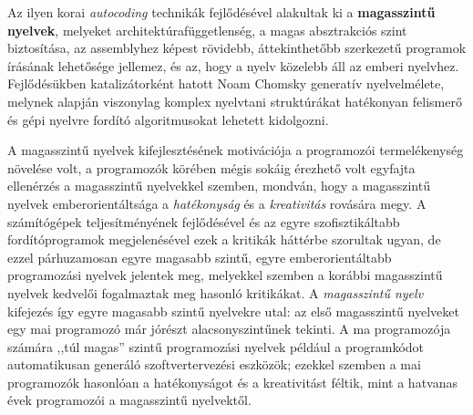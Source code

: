 Az ilyen korai \textit{autocoding} technikák fejlődésével alakultak ki a \textbf{magasszintű nyelvek}, melyeket architektúrafüggetlenség, a magas absztrakciós szint biztosítása, az assemblyhez képest rövidebb, áttekinthetőbb szerkezetű programok írásának lehetősége jellemez, és az, hogy a nyelv közelebb áll az emberi nyelvhez.
Fejlődésükben katalizátorként hatott Noam Chomsky generatív nyelvelmélete, melynek alapján viszonylag komplex nyelvtani struktúrákat hatékonyan felismerő és gépi nyelvre fordító algoritmusokat lehetett kidolgozni.

A magasszintű nyelvek kifejlesztésének motivációja a programozói termelékenység növelése volt\cite{Backus78}, a programozók körében mégis sokáig érezhető volt egyfajta ellenérzés a magasszintű nyelvekkel szemben, mondván, hogy a magasszintű nyelvek emberorientáltsága a \textit{hatékonyság} és a \textit{kreativitás} rovására megy\cite[12.~fejezet]{MythManMonth}.
A számítógépek teljesítményének fejlődésével és az egyre szofisztikáltabb fordítóprogramok megjelenésével ezek a kritikák háttérbe szorultak ugyan, de ezzel párhuzamosan egyre magasabb szintű, egyre emberorientáltabb programozási nyelvek jelentek meg, melyekkel szemben a korábbi magasszintű nyelvek kedvelői fogalmaztak meg hasonló kritikákat.
A \textit{magasszintű nyelv} kifejezés így egyre magasabb szintű nyelvekre utal: az első magasszintű nyelveket egy mai programozó már jórészt alacsonyszintűnek tekinti.
A ma programozója számára ,,túl magas'' szintű programozási nyelvek például a programkódot automatikusan generáló szoftvertervezési eszközök; ezekkel szemben a mai programozók hasonlóan a hatékonyságot és a kreativitást féltik, mint a hatvanas évek programozói a magasszintű nyelvektől\cite{Veto}.


